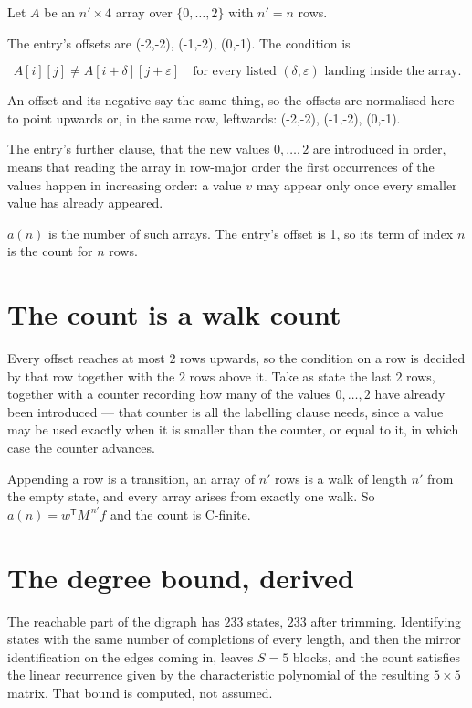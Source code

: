 \documentclass[11pt]{article}
\theoremstyle{definition}
\begin{document}
Let $A$ be an $n' \times 4$ array over $\{0,\dots,2\}$ with $n' = n$ rows.

The entry's offsets are (-2,-2), (-1,-2), (0,-1). The condition is

\[A[i][j] \ne A[i{+}\delta][j{+}\varepsilon]\quad\text{for every listed }(\delta,\varepsilon)\text{ landing inside the array.}\]

An offset and its negative say the same thing, so the offsets are normalised here to point upwards or, in the same row, leftwards: (-2,-2), (-1,-2), (0,-1).

The entry's further clause, that the new values $0,\dots,2$ are introduced in order, means that reading the array in row-major order the first occurrences of the values happen in increasing order: a value $v$ may appear only once every smaller value has already appeared.

$a(n)$ is the number of such arrays. The entry's offset is 1, so its term of index $n$ is the count for $n$ rows.

\section{The count is a walk count}

Every offset reaches at most $2$ rows upwards, so the condition on a row is decided by that row together with the $2$ rows above it. Take as state the last $2$ rows, together with a counter recording how many of the values $0,\dots,2$ have already been introduced --- that counter is all the labelling clause needs, since a value may be used exactly when it is smaller than the counter, or equal to it, in which case the counter advances.

Appending a row is a transition, an array of $n'$ rows is a walk of length $n'$ from the empty state, and every array arises from exactly one walk. So $a(n) = w^{\mathsf T}M^{\,n'}f$ and the count is C-finite.

\section{The degree bound, derived}

The reachable part of the digraph has $233$ states, $233$ after trimming. Identifying states with the same number of completions of every length, and then the mirror identification on the edges coming in, leaves $S = 5$ blocks, and the count satisfies the linear recurrence given by the characteristic polynomial of the resulting $5\times5$ matrix. That bound is computed, not assumed.
\end{document}
